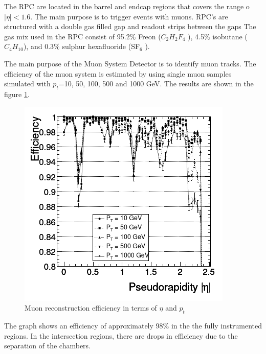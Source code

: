 The RPC are located in the barrel and endcap regions that covers the range o $|\eta|<1.6$. The main purpose is to trigger events with muons. 
RPC's are structured with a double gas filled gap and readout strips between the gaps
 The gas mix used in the RPC consist of 95.2$\%$ Freon
($C_2 H_2 F_4$ ), 4.5$\%$ isobutane ($C_4 H_{10}$), and 0.3$\%$ sulphur hexafluoride (SF$_6$ )\cite{cms7}.



The main purpose of the Muon System Detector is to identify muon tracks. 
The efficiency of the muon system is estimated by using single muon samples simulated with $p_t$=10, 50, 100, 500 and 1000 GeV. The results are shown in the figure \ref{mu-efi}.
\begin{figure}
	\centering
	\includegraphics[width=0.6\linewidth]{Chapter2/mu-efi}
	\caption[Muon reconstruction efficiency in terms of $\eta$ and $p_t$]{Muon reconstruction efficiency in terms of $\eta$ and $p_t$\cite{cms-manual}}
	\label{mu-efi}
\end{figure}
The graph shows an efficiency of approximately 98$\%$ in the the fully instrumented regions. In the intersection regions, there are drops in efficiency due to the separation of the chambers. %
